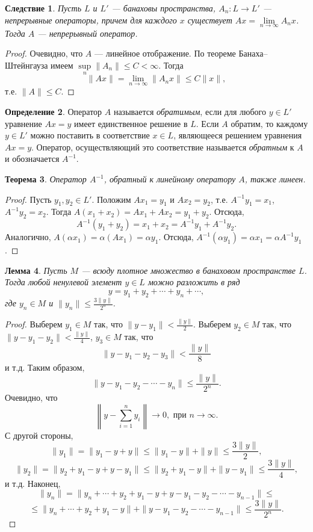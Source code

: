 \documentclass[12pt, titlepage, oneside]{amsbook}
\newtheorem{theorem}{Теорема}[chapter]
\newtheorem{lemma}[theorem]{Лемма}
\newtheorem{corollary}[theorem]{Следствие}
\theoremstyle{definition}
\newtheorem{definition}[theorem]{Определение}
\theoremstyle{remark}
\begin{document}
\begin{corollary}
	\label{Ban-Sh2}
	Пусть $L$ и $L'$ --- банаховы пространства, $A_n\colon L\rightarrow L'$ --- непрерывные операторы, причем для каждого $x$ существует $Ax=\lim\limits_{n\rightarrow\infty}A_n x$. Тогда $A$ --- непрерывный оператор.
\end{corollary}

\begin{proof}
	Очевидно, что $A$ --- линейное отображение. По теореме Банаха--Штейнгауза имеем $\sup\limits_n\|A_n\|\leq C<\infty$. Тогда $$\|Ax\|=\lim\limits_{n\rightarrow\infty}\|A_n x\|\leq C\|x\|,$$ т.е. $\|A\|\leq C$.
\end{proof}

\begin{definition}
	Оператор $A$ называется \emph{обратимым}, если для любого $y\in L'$ уравнение $Ax=y$ имеет единственное решение в $L$. Если $A$ обратим, то каждому $y\in L'$ можно поставить в соответствие $x\in L$, являющееся решением уравнения $Ax=y$. Оператор, осуществляющий это соответствие называется \emph{обратным} к $A$ и обозначается $A^{-1}$.
\end{definition}


\begin{theorem}
	\label{Op3}
	Оператор $A^{-1}$, обратный к линейному оператору $A$, также линеен.
\end{theorem}

\begin{proof}
	Пусть $y_1,y_2\in L'$. Положим $Ax_1=y_1$ и $Ax_2=y_2$, т.е. $A^{-1}y_1=x_1$, $A^{-1}y_2=x_2$. Тогда $A(x_1+x_2)=Ax_1+Ax_2=y_1+y_2$. Отсюда, $$A^{-1}(y_1+y_2)=x_1+x_2=A^{-1}y_1+A^{-1}y_2.$$ Аналогично, $A(\alpha x_1)=\alpha(Ax_1)=\alpha y_1$. Отсюда, $A^{-1}(\alpha y_1)=\alpha x_1=\alpha A^{-1}y_1$.
\end{proof}

\begin{lemma}
	\label{Op4} Пусть $M$ --- всюду плотное множество в банаховом пространстве $L$. Тогда любой ненулевой элемент $y\in L$ можно разложить в ряд $$y=y_1+y_2+\cdots+y_n+\cdots,$$ где $y_n\in M$ и $\|y_n\|\leq\frac{3\|y\|}{2^n}$.
\end{lemma}

\begin{proof}
	Выберем $y_1\in M$ так, что $\|y-y_1\|<\frac{\|y\|}{2}$. Выберем $y_2\in M$ так, что $\|y-y_1-y_2\|<\frac{\|y\|}{4}$, $y_3\in M$ так, что $$\|y-y_1-y_2-y_3\|<\frac{\|y\|}{8}$$ и т.д. Таким образом, $$\|y-y_1-y_2-\cdots-y_n\|\leq\frac{\|y\|}{2^n}.$$ Очевидно, что $$\left\|y-\sum\limits_{i=1}^n y_i\right\|\rightarrow 0,\text{ при } n\rightarrow\infty.$$ С другой стороны, $$\|y_1\|=\|y_1-y+y\|\leq\|y_1-y\|+\|y\|\leq\frac{3\|y\|}{2},$$
	$$\|y_2\|=\|y_2+y_1-y+y-y_1\|\leq\|y_2+y_1-y\|+\|y-y_1\|\leq\frac{3\|y\|}{4},$$ и т.д. Наконец, $$\|y_n\|=\|y_n+\cdots+y_2+y_1-y+y-y_1-y_2-\cdots-y_{n-1}\|\leq$$ $$\leq\|y_n+\cdots+y_2+y_1-y\|+\|y-y_1-y_2-\cdots-y_{n-1}\|\leq\frac{3\|y\|}{2^n}.$$
\end{proof}
\end{document}
